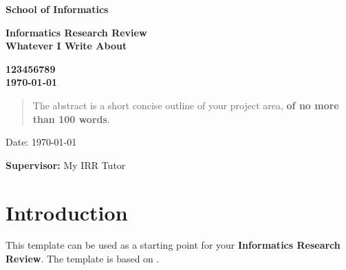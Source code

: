 \documentclass[a4paper,11pt]{article}
\newcommand{\examnumber}{123456789}
\newcommand{\field}{Whatever I Write About}
\newcommand{\supervisor}{My IRR Tutor}
\begin{document}
\begin{minipage}[b]{110mm}
        {\Huge\bf School of Informatics
        \vspace*{17mm}}
\end{minipage}
\hfill
\begin{minipage}[t]{40mm}               
\end{minipage}
\par\noindent
\vspace*{2cm}
\begin{center}
        \Large\bf Informatics Research Review \\
        \Large\bf \field
\end{center}
\vspace*{1.5cm}
\begin{center}
        \bf \examnumber\\
        \monthyeardate\today
\end{center}
\vspace*{5mm}

%
%                       
\begin{abstract}
        The abstract is a short concise outline of your 
        project area, {\bf of no more than 100 words}.
\end{abstract}

\vspace*{1cm}

\vspace*{3cm}
Date: \today

\vfill
{\bf Supervisor:} \supervisor
\newpage

\setcounter{page}{1}                            %
\footruleheight{1pt}
\headruleheight{1pt}
\rhead{- \thepage}
\cfoot{}
%
\tableofcontents                                %

\section{Introduction}

This template can be used as a starting point for your \textbf{Informatics Research Review}. The template is based on \cite{template}.
\end{document}
